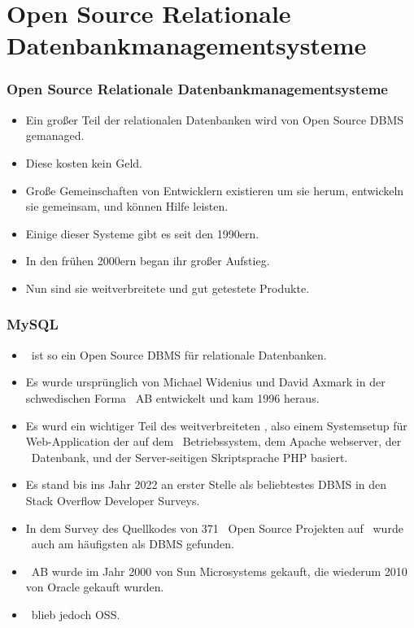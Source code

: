 \documentclass[aspectratio=169,mathserif,notheorems]{beamer}%
\begin{document}
\section{Open Source Relationale Datenbankmanagementsysteme}%
%
\begin{frame}%
\frametitle{Open Source Relationale Datenbankmanagementsysteme}%
\begin{itemize}%
\item Ein großer Teil der relationalen Datenbanken wird von Open Source DBMS gemanaged.%
\item<2-> Diese kosten kein Geld.%
\item<3-> Große Gemeinschaften von Entwicklern existieren um sie herum, entwickeln sie gemeinsam, und können Hilfe leisten.%
\item<4-> Einige dieser Systeme gibt es seit den 1990ern.%
\item<5-> In den frühen 2000ern began ihr großer Aufstieg\cite{P2004OSDMITM}.%
\item<6-> Nun sind sie weitverbreitete und gut getestete Produkte\cite{C20245YOQ}.%
\end{itemize}%
\end{frame}%
%
\begin{frame}%
\frametitle{MySQL}%
\begin{itemize}%
\item \mysql\ ist so ein Open Source DBMS für relationale Datenbanken\cite{WAM2002MRMDFTS,TA2024DDAMWPAM,BT2021HPM,RGS2021BTOTONAMDFPC,D2015LMAM}.%
\item<2-> Es wurde ursprünglich von Michael Widenius und David Axmark in der schwedischen Forma \mysql~AB entwickelt und kam 1996 heraus\cite{C20245YOQ}.%
\item<3-> Es wurd ein wichtiger Teil des weitverbreiteten \lampStack, also einem Systemsetup für Web-Application der auf dem \linux\ Betriebssystem, dem Apache webserver, der \mysql\ Datenbank, und der Server-seitigen Skriptsprache PHP basiert\cite{C2022HAFTLS,H2020ULU2E}.%
\item<4-> Es stand bis ins Jahr 2022 an erster Stelle als beliebtestes DBMS in den Stack Overflow Developer Surveys\cite{SE:SO:2024DS}.
\item<5-> In dem Survey\cite{PMPVEPWGSMB2025ATAODMSTTHOOSP} des Quellkodes von 371~ Open Source  Projekten auf \github\ wurde \mysql\ auch am häufigsten als DBMS gefunden.%
\item<6-> \mysql~AB wurde im Jahr 2000 von Sun Microsystems gekauft, die wiederum 2010 von Oracle gekauft wurden\cite{C20245YOQ}.%
\item<7-> \mysql\ blieb jedoch OSS.%
\end{itemize}%
\end{frame}%
\end{document}

